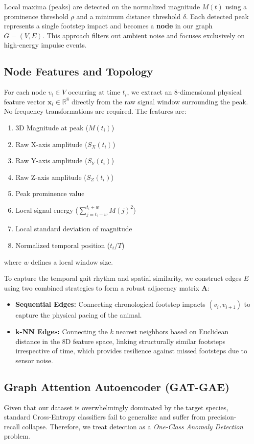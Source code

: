 \documentclass[conference, a4paper]{IEEEtran}
\begin{document}
Local maxima (peaks) are detected on the normalized magnitude $M(t)$ using a prominence threshold $\rho$ and a minimum distance threshold $\delta$. Each detected peak represents a single footstep impact and becomes a \textbf{node} in our graph $G = (V, E)$. This approach filters out ambient noise and focuses exclusively on high-energy impulse events.

\subsection{Node Features and Topology}
For each node $v_i \in V$ occurring at time $t_i$, we extract an 8-dimensional physical feature vector $\mathbf{x}_i \in \mathbb{R}^8$ directly from the raw signal window surrounding the peak. No frequency transformations are required. The features are:
\begin{enumerate}
    \item 3D Magnitude at peak ($M(t_i)$)
    \item Raw X-axis amplitude ($S_X(t_i)$)
    \item Raw Y-axis amplitude ($S_Y(t_i)$)
    \item Raw Z-axis amplitude ($S_Z(t_i)$)
    \item Peak prominence value
    \item Local signal energy ($\sum_{j=t_i-w}^{t_i+w} M(j)^2$)
    \item Local standard deviation of magnitude
    \item Normalized temporal position ($t_i / T$)
\end{enumerate}
where $w$ defines a local window size.

To capture the temporal gait rhythm and spatial similarity, we construct edges $E$ using two combined strategies to form a robust adjacency matrix $\mathbf{A}$:
\begin{itemize}
    \item \textbf{Sequential Edges:} Connecting chronological footstep impacts $(v_i, v_{i+1})$ to capture the physical pacing of the animal.
    \item \textbf{k-NN Edges:} Connecting the $k$ nearest neighbors based on Euclidean distance in the 8D feature space, linking structurally similar footsteps irrespective of time, which provides resilience against missed footsteps due to sensor noise.
\end{itemize}

\subsection{Graph Attention Autoencoder (GAT-GAE)}
Given that our dataset is overwhelmingly dominated by the target species, standard Cross-Entropy classifiers fail to generalize and suffer from precision-recall collapse. Therefore, we treat detection as a \textit{One-Class Anomaly Detection} problem.
\end{document}
